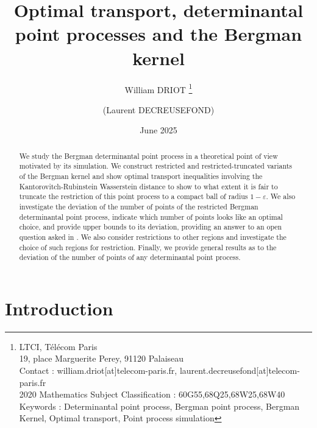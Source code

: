 \documentclass[11pt]{article}
\title{\textbf{Optimal transport, determinantal point processes and the Bergman kernel}}
\author{William DRIOT \thanks{LTCI, Télécom Paris \\ 19, place Marguerite Perey, 91120 Palaiseau \\ Contact : william.driot[at]telecom-paris.fr, laurent.decreusefond[at]telecom-paris.fr \\ 2020 Mathematics Subject Classification : 60G55,68Q25,68W25,68W40 \\ Keywords : Determinantal point process, Bergman point process, Bergman Kernel, Optimal transport, Point process simulation} \and (Laurent DECREUSEFOND) }
\date{June 2025}
\theoremstyle{plain}
\theoremstyle{definition}
\begin{document}
\maketitle

\begin{abstract}
    We study the Bergman determinantal point process in a theoretical point of view motivated by its simulation. We construct restricted and restricted-truncated variants of the Bergman kernel and show optimal transport inequalities involving the Kantorovitch-Rubinstein Wasserstein distance to show to what extent it is fair to truncate the restriction of this point process to a compact ball of radius $1 - \varepsilon $. We also investigate the deviation of the number of points of the restricted Bergman determinantal point process, indicate which number of points looks like an optimal choice, and provide upper bounds to its deviation, providing an answer to an open question asked in \cite{Decreusefond2016}. We also consider restrictions to other regions and investigate the choice of such regions for restriction. Finally, we provide general results as to the deviation of the number of points of any determinantal point process.
\end{abstract}

\tableofcontents

\setlength{\parindent}{15pt} %
\setlength{\parskip}{6pt}    %

\section{Introduction}
\end{document}
